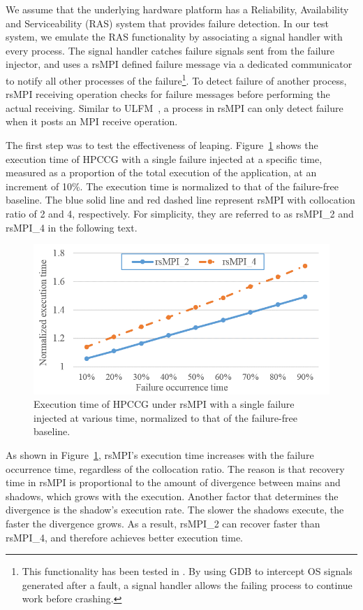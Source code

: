 We assume that the underlying hardware platform has a Reliability, Availability and Serviceability (RAS) system that provides failure detection. In our test system, we emulate the RAS functionality by associating a signal handler with every process. The signal handler catches failure signals sent from the failure injector, and uses a rsMPI defined failure message via a dedicated communicator to notify all other processes of the failure\footnote{This functionality has been tested in \cite{fang2017letgo}. By using GDB to intercept OS signals generated after a fault, a signal handler allows the failing process to continue work before crashing.}. 
To detect failure of another process, rsMPI receiving operation checks for failure messages before performing the actual receiving. 
Similar to ULFM~\cite{bland2013post}, a process in rsMPI can only detect failure when it posts an MPI receive operation. 

The first step was to test the effectiveness of leaping.  
Figure~\ref{fig:single_failure} shows the execution time of HPCCG with a single failure injected at a specific time, measured as a proportion of the total execution of the application, at an increment of 10\%.
The execution time is normalized to that of the failure-free baseline.   
The blue solid line and red dashed line represent rsMPI with collocation ratio of 2 and 4, respectively. For simplicity, they are referred to as rsMPI\_2 and rsMPI\_4 in the following text.  


\begin{figure}[!t]
  \begin{center}
      \includegraphics[width=0.6\columnwidth]{Figures/single_failure_hpcc}
  \end{center}
  \vskip -0.2in
  \caption{Execution time of HPCCG under rsMPI with a single failure injected at various time, normalized to that of the failure-free baseline.}
  \label{fig:single_failure}
\end{figure}

As shown in Figure~\ref{fig:single_failure}, rsMPI's execution time increases with the failure occurrence time, regardless of the collocation ratio. The reason is that recovery time in rsMPI is proportional to the amount of divergence between mains and shadows, which grows with the execution. 
Another factor that determines the divergence is the shadow's execution rate. The slower the shadows execute, the faster the divergence grows. As a result, rsMPI\_2 can recover faster than rsMPI\_4, and therefore achieves better execution time.



